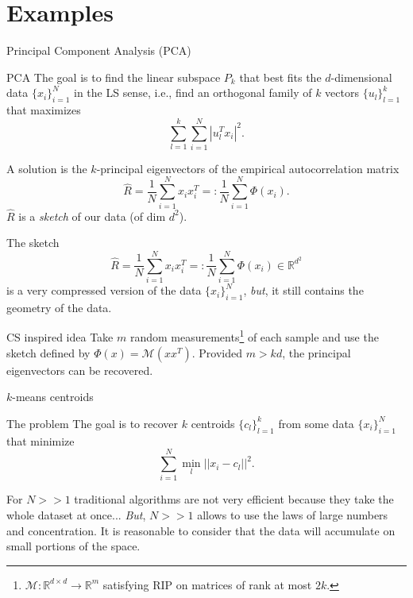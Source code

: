 \section{Examples}
\begin{frame}{Principal Component Analysis (PCA)}
	\begin{block}{PCA}
		The goal is to find the linear subspace $P_k$ that best fits the $d$-dimensional data $\{x_i\}_{i=1}^N$ in the LS sense, i.e., find an orthogonal family of $k$ vectors $\{u_l\}_{l=1}^k$ that maximizes
		\begin{equation*}
				\sum_{l=1}^k\sum_{i=1}^N |u_l^Tx_i|^2.
		\end{equation*}
	\end{block}
	A solution is the $k$-principal eigenvectors of the empirical autocorrelation matrix
	\begin{equation*}
		\hat{R} = \frac{1}{N}\sum_{i=1}^N x_ix_i^T =: \frac{1}{N}\sum_{i=1}^N \Phi(x_i).
	\end{equation*}
	$\hat{R}$ is a \emph{sketch} of our data (of dim $d^2$).
\end{frame}


\begin{frame}
	The sketch 
	\begin{equation*}
		\hat{R} = \frac{1}{N}\sum_{i=1}^N x_ix_i^T =: \frac{1}{N}\sum_{i=1}^N \Phi(x_i) \in \mathbb{R}^{d^2}
	\end{equation*}
 	is a very compressed version of the data $\{x_i\}_{i=1}^N$, \emph{but}, it still contains the geometry of the data.
	\begin{block}{CS inspired idea}
		Take $m$ random measurements\footnote{$\mathcal{M}:\mathbb{R}^{d\times d}\to \mathbb{R}^m$ satisfying RIP on matrices of rank at most $2k$.} of each sample and use the sketch defined by $\Phi(x) = \mathcal{M}(xx^T)$. Provided $m>kd$, the principal eigenvectors can be recovered.
	\end{block}

\end{frame}

\begin{frame}{$k$-means centroids}
	\begin{block}{The problem}
		The goal is to recover $k$ centroids $\{c_l\}_{l=1}^k$ from some data $\{x_i\}_{i=1}^N$ that minimize
		\begin{equation*}
			\sum_{i=1}^N \min_l ||x_i - c_l||^2.
		\end{equation*}
	\end{block}
	For $N>>1$ traditional algorithms are not very efficient because they take the whole dataset at once...
	\newline
	\emph{But}, $N>>1$ allows to use the laws of large numbers and concentration. It is reasonable to consider that the data will accumulate on small portions of the space.

\end{frame}


